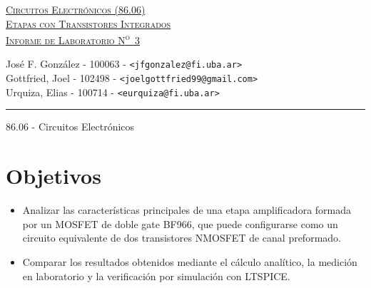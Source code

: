 \documentclass[a4paper, 10pt, spanish]{article}
\begin{document}
\begin{titlepage}
\vfill

\begin{center} %
\Large{\underline{\textsc{Circuitos Electrónicos (86.06)}}}\\ \vspace{0.5cm}
\Large{\underline{\textsc{Etapas con Transistores Integrados}}}\\ \vspace{0.5cm}
\Large{\underline{\textsc{Informe de Laboratorio N\textsuperscript{o}~3}}}
\end{center}

\vfill

\begin{center}
\large{José F. González - 100063 - \footnotesize{\verb!<jfgonzalez@fi.uba.ar>!}}\\ \vspace{0.25cm}
\large{Gottfried, Joel - 102498 - \footnotesize{\verb!<joelgottfried99@gmail.com>!}}\\\vspace{0.25cm}
\large{Urquiza, Elias - 100714 - \footnotesize{\verb!<eurquiza@fi.uba.ar>!}}\\
\end{center}

\vfill

\hrule
\vspace{0.2cm}

\noindent\small{86.06 - Circuitos Electrónicos \hfill }

\end{titlepage}

%
%
\setcounter{page}{1}

%
%
\tableofcontents
\newpage


\section{Objetivos}
  \begin{itemize}
    \item Analizar las características principales de una etapa amplificadora formada por un MOSFET de doble gate BF966, que puede configurarse como un circuito equivalente de dos transistores NMOSFET de canal preformado.
    \item Comparar los resultados obtenidos mediante el cálculo analítico, la medición en laboratorio y la verificación por simulación con LTSPICE.
  \end{itemize}
\end{document}
